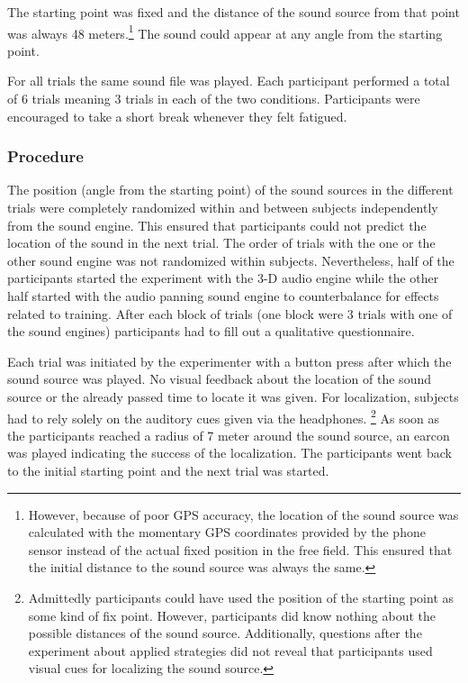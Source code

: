 \documentclass[journal]{IEEEtran}
\begin{document}
The starting point was fixed and the distance of the sound source from that point was always 48 meters.\footnote{However, because of poor GPS accuracy, the location of the sound source was calculated with the momentary GPS coordinates provided by the phone sensor instead of the actual fixed position in the free field. This ensured that the initial distance to the sound source was always the same.} The sound could appear at any angle from the starting point.

For all trials the same sound file was played. Each participant performed a total of 6 trials meaning 3 trials in each of the two conditions. Participants were encouraged to take a short break whenever they felt fatigued.

\subsubsection{Procedure}
The position (angle from the starting point) of the sound sources in the different trials were completely randomized within and between subjects independently from the sound engine. This ensured that participants could not predict the location of the sound in the next trial. The order of trials with the one or the other sound engine was not randomized within subjects. Nevertheless, half of the participants started the experiment with the 3-D audio engine while the other half started with the audio panning sound engine to counterbalance for effects related to training. After each block of trials (one block were 3 trials with one of the sound engines) participants had to fill out a qualitative questionnaire.

Each trial was initiated by the experimenter with a button press after which the sound source was played. No visual feedback about the location of the sound source or the already passed time to locate it was given. For localization, subjects had to rely solely on the auditory cues given via the headphones. \footnote{Admittedly participants could have used the position of the starting point as some kind of fix point. However, participants did know nothing about the possible distances of the sound source. Additionally, questions after the experiment about applied strategies did not reveal that participants used visual cues for localizing the sound source.} As soon as the participants reached a radius of 7 meter around the sound source, an earcon was played indicating the success of the localization. The participants went back to the initial starting point and the next trial was started.
\end{document}
